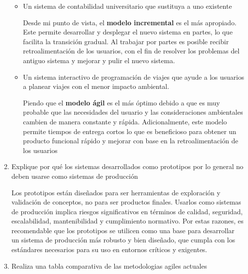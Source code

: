 \begin{enumerate}
\begin{itemize}
                \item Un sistema de contabilidad universitario que sustituya a uno existente

                    Desde mi punto de vista, el \textbf{modelo incremental} es el más
                    apropiado. Este permite desarrollar y desplegar el nuevo sistema en partes,
                    lo que facilita la transición gradual. Al trabajar por partes es posible
                    recibir retroalimentación de los usuarios, con el fin de resolver los
                    problemas del antiguo sistema y mejorar y pulir el nuevo sistema.

                \item Un sistema interactivo de programación de viajes que ayude a los usuarios
                    a planear viajes con el menor impacto ambiental.

                    Piendo que el \textbf{modelo ágil} es el más óptimo debido a que es
                    muy probable que las necesidades del usuario y las consideraciones
                    ambientales cambien de manera constante y rápida. Adicionalmente, este
                    modelo permite tiempos de entrega cortos lo que es beneficioso para
                    obtener un producto funcional rápido y mejorar con base en la
                    retroalimentación de los usuarios
            \end{itemize}

        \item Explique por qué los sistemas desarrollados como prototipos por lo general no
            deben usarse como sistemas de producción

            Los prototipos están diseñados para ser herramientas de exploración y
            validación de conceptos, no para ser productos finales. Usarlos como sistemas
            de producción implica riesgos significativos en términos de calidad, seguridad,
            escalabilidad, mantenibilidad y cumplimiento normativo. Por estas razones, es recomendable
            que los prototipos se utilicen como una base para desarrollar un sistema de producción
            más robusto y bien diseñado, que cumpla con los estándares necesarios para su
            uso en entornos críticos y exigentes.

        \item Realiza una tabla comparativa de las metodologias agiles actuales


\end{enumerate}
